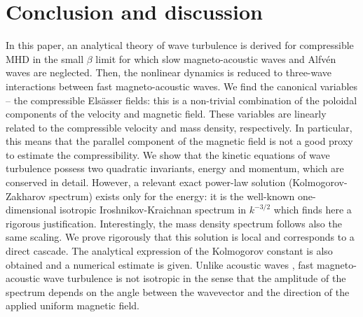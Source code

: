 \documentclass{jpp}
\newcommand{\red}[1]{}
\begin{document}
\section{Conclusion and discussion}

In this paper, an analytical theory of wave turbulence is derived for compressible MHD in the small $\beta$ limit for which slow magneto-acoustic waves and Alfv\'en waves are neglected. Then, the nonlinear dynamics is reduced to three-wave interactions between fast magneto-acoustic waves. We find the canonical variables -- the compressible Els\"asser fields: this is a non-trivial combination of the poloidal components of the velocity and magnetic field. These variables are linearly related to the compressible velocity and mass density, respectively. In particular, this means that the parallel component of the magnetic field is not a good proxy to estimate the compressibility. We show that the kinetic equations of wave turbulence possess two quadratic invariants, energy and momentum, which are conserved in detail. However, a relevant exact power-law solution (Kolmogorov-Zakharov spectrum) exists only for the energy: it is the well-known one-dimensional isotropic Iroshnikov-Kraichnan spectrum in $k^{-3/2}$ which finds here a rigorous justification. Interestingly, the mass density spectrum follows also the same scaling. We prove rigorously that this solution is local and corresponds to a direct cascade. The analytical expression of the Kolmogorov constant is also obtained and a numerical estimate is given. 
Unlike acoustic waves \red{\citep{Zakharov1970}}, fast magneto-acoustic wave turbulence is not isotropic in the sense that the amplitude of the spectrum depends on the angle between the wavevector and the direction of the applied uniform magnetic field. 
\end{document}
